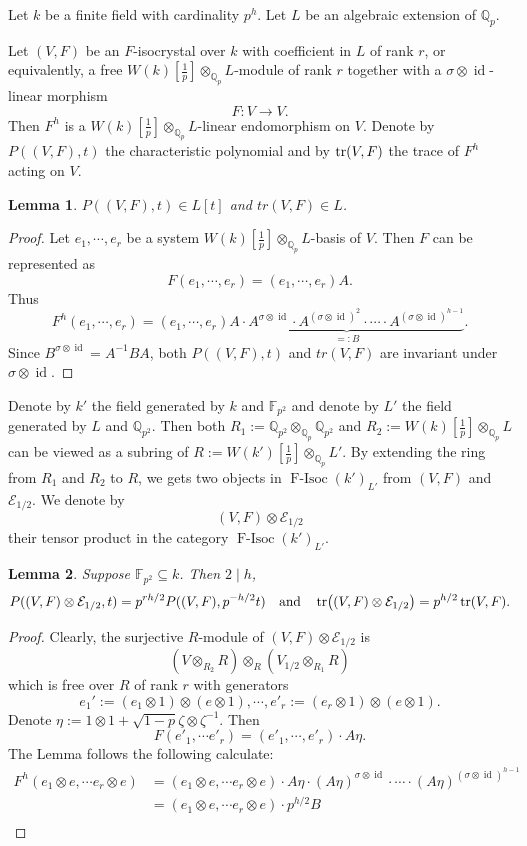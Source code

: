\documentclass[12pt,twoside]{book}
\theoremstyle{plain}
\newtheorem{lemma}[lemma]{Lemma}
\theoremstyle{definition}
\theoremstyle{remark}
\newcommand{\bF}{{\mathbb F}}
\newcommand{\bQ}{{\mathbb Q}}
\newcommand{\mE}{{\mathcal E}}
\DeclareMathOperator\id{id}
\DeclareMathOperator{\FIsoc}{F-Isoc}
\numberwithin{equation}{section}
\begin{document}
Let $k$ be a finite field with cardinality $p^h$. Let $L$ be an algebraic extension of $\bQ_{p}$.

Let $(V,F)$ be an $F$-isocrystal over $k$ with coefficient in $L$ of rank $r$, or equivalently, a free $W(k)[\frac1p]\otimes_{\bQ_p} L$-module of rank $r$ together with a $\sigma\otimes \id$-linear morphism
\[F\colon V\rightarrow V.\]
Then $F^h$ is a $W(k)[\frac1p]\otimes_{\bQ_p} L$-linear endomorphism on $V$. Denote by $P((V,F),t)$ the characteristic polynomial and by $\tr(V,F)$ the trace of $F^h$ acting on $V$.

\begin{lemma}
$P((V,F),t)\in L[t]$ and $tr(V,F)\in L$.
\end{lemma}
\begin{proof}
Let $e_1,\cdots,e_r$ be a system $W(k)[\frac1p]\otimes_{\bQ_p} L$-basis of $V$. Then $F$ can be represented as
\[F(e_1,\cdots,e_r) = (e_1,\cdots,e_r) A.\]
Thus
\[F^h (e_1,\cdots,e_r) = (e_1,\cdots,e_r) \underbrace{A\cdot A^{\sigma\otimes\id}\cdot A^{(\sigma\otimes\id)^2}\cdot \cdots \cdot A^{(\sigma\otimes\id)^{h-1}}}_{=: B}.\]
Since $B^{\sigma\otimes\id} = A^{-1} B A$, both $P((V,F),t)$ and $tr(V,F)$ are invariant under $\sigma\otimes\id$.
\end{proof}

Denote by $k'$ the field generated by $k$ and $\bF_{p^2}$ and denote by $L'$ the field generated by $L$ and $\bQ_{p^2}$. Then both
$R_1:=\bQ_{p^2}\otimes_{\bQ_p} \bQ_{p^2}$ and $R_2:=W(k)[\frac1p]\otimes_{\bQ_p} L$
can be viewed as a subring of $R:=W(k')[\frac1p]\otimes_{\bQ_p} L'$.
By extending the ring from $R_1$ and $R_2$ to $R$, we gets two objects in $\FIsoc(k')_{L'}$ from $(V,F)$ and $\mE_{1/2}$. We denote by
\[(V,F)\otimes \mE_{1/2}\]
their tensor product in the category $\FIsoc(k')_{L'}$.

\begin{lemma} Suppose $\bF_{p^2}\subseteq k$. Then $2\mid h$,
\[P((V,F)\otimes\mE_{1/2},t) = p^{rh/2}P((V,F),p^{-h/2}t) \quad \text{and} \quad \tr((V,F)\otimes\mE_{1/2}) = p^{h/2} \tr(V,F).\]
\end{lemma}

\begin{proof}
Clearly, the surjective $R$-module of $(V,F)\otimes \mE_{1/2}$ is
\[(V\otimes_{R_2}R)\otimes_R(V_{1/2}\otimes_{R_1}R)\]
which is free over $R$ of rank $r$ with generators
\[e_1':=(e_1\otimes1)\otimes (e\otimes1),\cdots,e'_r:=(e_r\otimes1)\otimes(e\otimes1).\] Denote $\eta:=1\otimes1+\sqrt{1-p}\zeta\otimes\zeta^{-1}$. Then
\[F(e'_1,\cdots e'_r) = (e'_1,\cdots,e'_r)\cdot A\eta.\]
The Lemma follows the following calculate:
\begin{equation*}
\begin{split}
F^h (e_1\otimes e,\cdots e_r\otimes e)
&= (e_1\otimes e,\cdots e_r\otimes e)\cdot A\eta\cdot (A\eta)^{\sigma\otimes\id} \cdot \cdots \cdot (A\eta)^{(\sigma\otimes\id)^{h-1}} \\
&= (e_1\otimes e,\cdots e_r\otimes e)\cdot p^{h/2}B\\
\end{split}
\end{equation*}
\end{proof}
\end{document}
